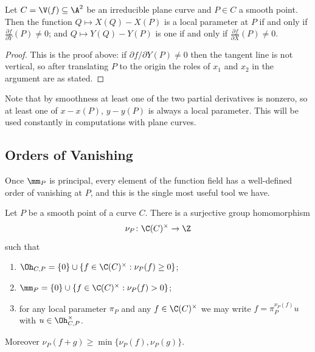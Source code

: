 \begin{corollary}\label{cor:localparamplane}
	Let $C = \V(f) \subseteq \A^2$ be an irreducible plane curve and $P \in C$ a smooth point. Then the function $Q \mapsto X(Q) - X(P)$ is a local parameter at $P$ if and only if $\frac{\partial f}{\partial Y}(P) \neq 0$; and $Q \mapsto Y(Q) - Y(P)$ is one if and only if $\frac{\partial f}{\partial X}(P) \neq 0$.
\end{corollary}

\begin{proof}
	This is the proof above: if $\partial f/\partial Y (P) \neq 0$ then the tangent line is not vertical, so after translating $P$ to the origin the roles of $x_1$ and $x_2$ in the argument are as stated.
\end{proof}

Note that by smoothness at least one of the two partial derivatives is nonzero, so at least one of $x - x(P)$, $y - y(P)$ is always a local parameter. This will be used constantly in computations with plane curves.

\subsection{Orders of Vanishing}

Once $\mm_P$ is principal, every element of the function field has a well-defined order of vanishing at $P$, and this is the single most useful tool we have.

\begin{corollary}[Valuation]\label{cor:valuation}
	Let $P$ be a smooth point of a curve $C$. There is a surjective group homomorphism
	$$\nu_P \colon \C(C)^\times \to \Z$$
	such that
	\begin{enumerate}[label=(\roman*)]
		\item $\Oh_{C,P} = \{0\} \cup \{f \in \C(C)^\times : \nu_P(f) \geq 0\}$;
		\item $\mm_P = \{0\} \cup \{f \in \C(C)^\times : \nu_P(f) > 0\}$;
		\item for any local parameter $\pi_P$ and any $f \in \C(C)^\times$ we may write $f = \pi_P^{\nu_P(f)}u$ with $u \in \Oh_{C,P}^\times$.
	\end{enumerate}
	Moreover $\nu_P(f+g) \geq \min\{\nu_P(f),\nu_P(g)\}$.
\end{corollary}

